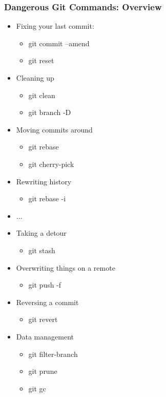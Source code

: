 \documentclass{beamer}
\begin{document}
\begin{frame}[fragile]
\frametitle{Dangerous Git Commands: Overview}
\begin{itemize}
\item Fixing your last commit:
\begin{itemize}
\item git commit --amend
\item git reset
\end{itemize}
\item Cleaning up
\begin{itemize}
\item git clean
\item git branch -D
\end{itemize}
\item Moving commits around
\begin{itemize}
\item git rebase
\item git cherry-pick
\end{itemize}
\item Rewriting history
\begin{itemize}
\item git rebase -i
\end{itemize}
\item ...
\end{itemize}
\end{frame}

\begin{frame}[fragile]
\begin{itemize}
\item Taking a detour
\begin{itemize}
\item git stash
\end{itemize}
\item Overwriting things on a remote
\begin{itemize}
\item git push -f
\end{itemize}
\item Reversing a commit
\begin{itemize}
\item git revert
\end{itemize}
\item Data management
\begin{itemize}
\item git filter-branch
\item git prune
\item git gc
\end{itemize}
\end{itemize}
\end{frame}
\end{document}
